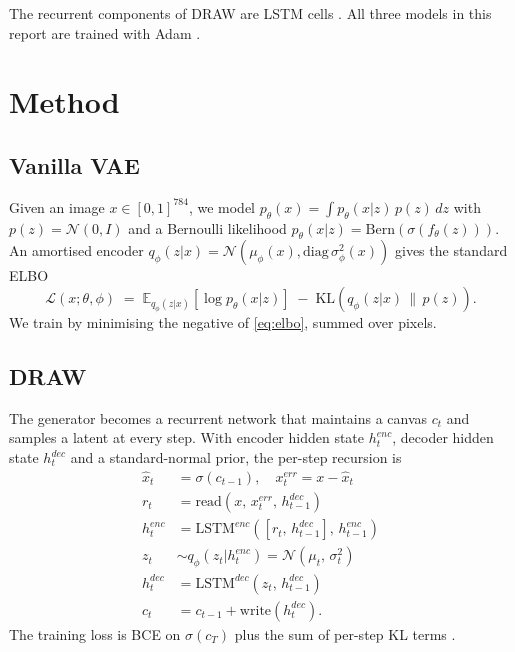 \documentclass{article}
\begin{document}
The recurrent components of DRAW are LSTM cells \citep{hochreiter1997lstm}. All
three models in this report are trained with Adam \citep{kingma2015adam}.

\section{Method}
\label{sec:method}

\subsection{Vanilla VAE}

Given an image \(x \in [0,1]^{784}\), we model
\(p_\theta(x) = \int p_\theta(x|z)\, p(z)\, dz\) with
\(p(z) = \mathcal{N}(0,I)\) and a Bernoulli likelihood
\(p_\theta(x|z) = \mathrm{Bern}(\sigma(f_\theta(z)))\).
An amortised encoder
\(q_\phi(z|x) = \mathcal{N}(\mu_\phi(x), \mathrm{diag}\,\sigma_\phi^2(x))\)
gives the standard ELBO
\begin{equation}
\mathcal{L}(x;\theta,\phi)
  \;=\; \mathbb{E}_{q_\phi(z|x)}\!\left[\log p_\theta(x|z)\right]
  \;-\; \mathrm{KL}\!\left(q_\phi(z|x) \,\|\, p(z)\right).
\label{eq:elbo}
\end{equation}
We train by minimising the negative of \eqref{eq:elbo}, summed over pixels.

\subsection{DRAW}

The generator becomes a recurrent network that maintains a canvas \(c_t\)
and samples a latent at every step.  With encoder hidden state \(h^{enc}_t\),
decoder hidden state \(h^{dec}_t\) and a standard-normal prior, the per-step
recursion is
\begin{align}
\hat{x}_t &= \sigma(c_{t-1}), \quad x^{err}_t = x - \hat{x}_t \\
r_t       &= \mathrm{read}(x,\, x^{err}_t,\, h^{dec}_{t-1}) \\
h^{enc}_t &= \mathrm{LSTM}^{enc}([r_t,\, h^{dec}_{t-1}],\, h^{enc}_{t-1}) \\
z_t       &\sim q_\phi(z_t|h^{enc}_t)
           = \mathcal{N}(\mu_t,\, \sigma_t^2) \\
h^{dec}_t &= \mathrm{LSTM}^{dec}(z_t,\, h^{dec}_{t-1}) \\
c_t       &= c_{t-1} + \mathrm{write}(h^{dec}_t).
\end{align}
The training loss is BCE on \(\sigma(c_T)\) plus the sum of per-step KL
terms \citep{gregor2015draw}.
\end{document}
